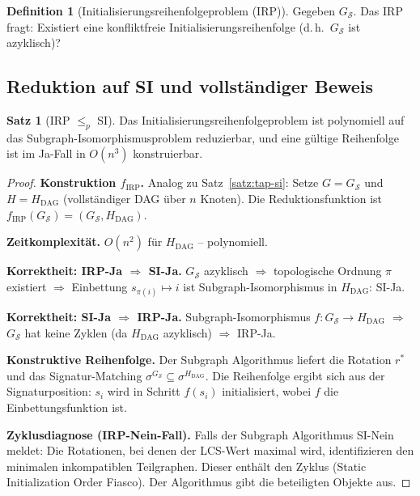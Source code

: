 ﻿\documentclass[a4paper,12pt]{article}
\theoremstyle{definition}
\newtheorem{definition}{Definition}
\newtheorem{satz}{Satz}
\begin{document}
\begin{definition}[Initialisierungsreihenfolgeproblem (IRP)]
\label{def:irp}
Gegeben $G_{\mathcal{S}}$. Das IRP fragt: Existiert eine konfliktfreie Initialisierungsreihenfolge (d.\,h.\ $G_{\mathcal{S}}$ ist azyklisch)?
\end{definition}

\subsection{Reduktion auf SI und vollständiger Beweis}

\begin{satz}[IRP $\leq_p$ SI]
\label{satz:irp-si}
Das Initialisierungsreihenfolgeproblem ist polynomiell auf das Subgraph-Isomorphismusproblem reduzierbar, und eine gültige Reihenfolge ist im Ja-Fall in $O(n^3)$ konstruierbar.
\end{satz}

\begin{proof}
\textbf{Konstruktion $f_{\text{IRP}}$.}
Analog zu Satz~\ref{satz:tap-si}: Setze $G = G_{\mathcal{S}}$ und $H = H_{\text{DAG}}$ (vollstän\-diger DAG über $n$ Knoten). Die Reduktionsfunktion ist $f_{\text{IRP}}(G_{\mathcal{S}}) = (G_{\mathcal{S}}, H_{\text{DAG}})$.

\textbf{Zeitkomplexität.} $O(n^2)$ für $H_{\text{DAG}}$ -- polynomiell.

\textbf{Korrektheit: IRP-Ja $\Rightarrow$ SI-Ja.}
$G_{\mathcal{S}}$ azyklisch $\Rightarrow$ topologische Ordnung $\pi$ existiert $\Rightarrow$ Einbettung $s_{\pi(i)} \mapsto i$ ist Subgraph-Isomorphismus in $H_{\text{DAG}}$: SI-Ja.

\textbf{Korrektheit: SI-Ja $\Rightarrow$ IRP-Ja.}
Subgraph-Isomorphismus $f: G_{\mathcal{S}} \to H_{\text{DAG}}$ $\Rightarrow$ $G_{\mathcal{S}}$ hat keine Zyklen (da $H_{\text{DAG}}$ azyklisch) $\Rightarrow$ IRP-Ja.

\textbf{Konstruktive Reihenfolge.}
Der Subgraph Algorithmus liefert die Rotation $r^*$ und das Signatur-Matching $\sigma^{G_{\mathcal{S}}} \subseteq \sigma^{H_{\text{DAG}}}$. Die Reihenfolge ergibt sich aus der Signaturposition: $s_i$ wird in Schritt $f(s_i)$ initialisiert, wobei $f$ die Einbettungsfunktion ist.

\textbf{Zyklusdiagnose (IRP-Nein-Fall).}
Falls der Subgraph Algorithmus SI-Nein meldet: Die Rotationen, bei denen der LCS-Wert maximal wird, identifizieren den minimalen inkompatiblen Teilgraphen. Dieser enthält den Zyklus (Static Initialization Order Fiasco). Der Algorithmus gibt die beteiligten Objekte aus.
\end{proof}
\end{document}
